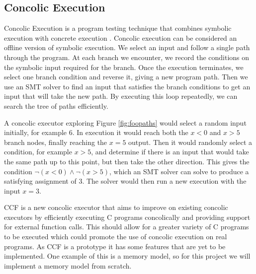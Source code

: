 \documentclass[12pt,twoside]{report}
\begin{document}

\subsection{Concolic Execution}
Concolic Execution is a program testing technique that combines symbolic execution with concrete execution \cite{217563}.
Concolic execution can be considered an offline version of symbolic execution. We select an input and follow a single path through the program. At each branch we encounter, we record the conditions on the symbolic input required for the branch. Once the execution terminates, we select one branch condition and reverse it, giving a new program path. Then we use an SMT solver to find an input that satisfies the branch conditions to get an input that will take the new path. By executing this loop repeatedly, we can search the tree of paths efficiently.

A concolic executor exploring Figure \ref{fig:foopaths} would select a random input initially, for example 6. In execution it would reach both the $x < 0$ and $x > 5$ branch nodes, finally reaching the $x = 5$ output. Then it would randomly select a condition, for example $x > 5$, and determine if there is an input that would take the same path up to this point, but then take the other direction. This gives the condition $\neg(x < 0) \wedge \neg(x > 5)$, which an SMT solver can solve to produce a satisfying assignment of $3$. The solver would then run a new execution with the input $x = 3$.


CCF is a new concolic executor that aims to improve on existing concolic executors by efficiently executing C programs concolically and providing support for external function calls. This should allow for a greater variety of C programs to be executed which could promote the use of concolic execution on real programs. As CCF is a prototype it has some features that are yet to be implemented. One example of this is a memory model, so for this project we will implement a memory model from scratch.
\end{document}

